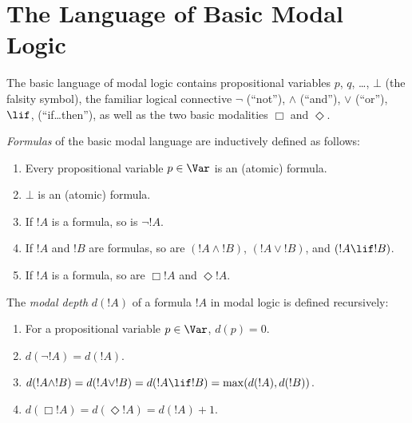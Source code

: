 \documentclass[modal-logic]{subfiles}
\begin{document}
\section{The Language of Basic Modal Logic}

The basic language of modal logic contains propositional variables
$p$, $q$, \dots, $\bot$ (the falsity symbol), the familiar logical connective $\lnot$ (``not''),
$\land$ (``and''), $\lor$ (``or''), $\lif$, (``if\dots then''), as
well as the two basic modalities $\Box$ and $\Diamond$.  

\begin{defn}
\emph{Formulas} of the basic modal language are inductively defined as follows:
\begin{enumerate}
\item Every propositional variable $p \in \Var$ is an (atomic) formula.
\item $\bot$ is an (atomic) formula.
\item If $!A$ is a formula, so is $\lnot !A$.
\item If $!A$ and $!B$ are formulas, so are $(!A \land !B)$, $(!A \lor !B)$, and $(!A \lif !B)$.
\item If $!A$ is a formula, so are $\Box !A$ and $\Diamond !A$.
\end{enumerate}
\end{defn}


\begin{defn}
The \emph{modal depth} $d(!A)$ of a formula $!A$ in modal logic is defined recursively:
\begin{enumerate}
\item For a propositional variable $p \in \Var$, $d(p) = 0$.
\item $d(\lnot !A) = d(!A)$.
\item $d(!A \land !B) = d(!A \lor !B) = d(!A \lif !B) = \max( d(!A), d(!B))$.
\item $d(\Box !A) = d(\Diamond !A) = d(!A) + 1$.
\end{enumerate}
\end{defn}
\end{document}
